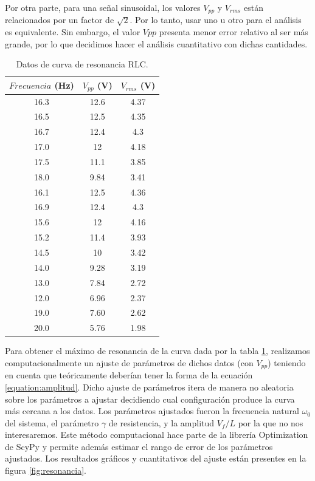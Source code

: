\documentclass[%
 reprint,
 amsmath,amssymb,
 aps,
]{revtex4-1}
\begin{document}
Por otra parte, para una señal sinusoidal, los valores $V_{pp}$ y $V_{rms}$ est\'an relacionados por un factor de $\sqrt{2}$. Por lo tanto, usar uno u otro para el an\'alisis es equivalente. Sin embargo, el valor $V{pp}$ presenta menor error relativo al ser m\'as grande, por lo que decidimos hacer el an\'alisis cuantitativo con dichas cantidades.\\

\begin{table}[h!]
\centering
 \begin{tabular}{|c|c|c|} 
 \hline
 $Frecuencia$ (Hz) & $V_{pp}$ (V) & $V_{rms}$ (V) \\ [0.5ex] 
 \hline\hline
16.3 &		12.6 &		4.37\\
16.5 &		12.5 &		4.35\\
16.7 &		12.4 &		4.3\\
17.0 &		12 &		4.18\\
17.5 &		11.1 &		3.85\\
18.0 &		9.84 &		3.41\\
16.1 &		12.5 &		4.36\\
16.9 &		12.4 &		4.3\\
15.6 &		12 &		4.16\\
15.2 &		11.4 &		3.93\\
14.5 &		10 &		3.42\\
14.0 &		9.28 &		3.19\\
13.0 &		7.84 &		2.72\\
12.0 &		6.96 &		2.37\\
19.0 &		7.60 &		2.62\\
20.0 &		5.76 &		1.98\\
[1ex] 
 \hline
 \end{tabular}
 \caption{Datos de curva de resonancia RLC.}
 \label{table:resonancia}
\end{table}

Para obtener el máximo de resonancia de la curva dada por la tabla \ref{table:resonancia}, realizamos computacionalmente un ajuste de parámetros de dichos datos (con $V_{pp}$) teniendo en cuenta que te\'oricamente deber\'ian tener la forma de la ecuaci\'on \ref{equation:amplitud}. Dicho ajuste de parámetros itera de manera no aleatoria sobre los par\'ametros a ajustar decidiendo cual configuraci\'on produce la curva m\'as cercana a los datos. Los par\'ametros ajustados fueron la frecuencia natural $\omega_0$ del sistema, el par\'ametro $\gamma$ de resistencia, y la amplitud $V_f/L$ por la que no nos interesaremos. Este m\'etodo computacional hace parte de la librer\'ia Optimization de ScyPy y permite adem\'as estimar el rango de error de los par\'ametros ajustados. Los resultados gr\'aficos y cuantitativos del ajuste est\'an presentes en la figura \ref{fig:resonancia}.\\
\end{document}
